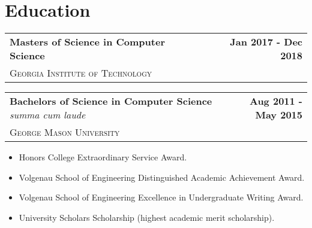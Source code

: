 \documentclass[letterpaper]{article}
\newenvironment{details}
{\begin{itemize}}
{\end{itemize}}
\begin{document}
  \setcounter{secnumdepth}{0}

  \section{Education}

  \noindent
  \begin{tabularx}{\textwidth}{@{}X r@{}}
    \textbf{Masters of Science in Computer Science} & \textbf{Jan 2017 - Dec 2018} \\
    \textsc{Georgia Institute of Technology} &
  \end{tabularx}

  \hfill\newline

  \noindent
  \begin{tabularx}{\textwidth}{@{}X r@{}}
    \textbf{Bachelors of Science in Computer Science} \emph{summa cum laude} & \textbf{Aug 2011 - May 2015} \\
    \textsc{George Mason University} &
  \end{tabularx}

  \begin{details}
  \item Honors College Extraordinary Service Award.
  \item Volgenau School of Engineering Distinguished Academic Achievement Award.
  \item Volgenau School of Engineering Excellence in Undergraduate Writing Award.
  \item University Scholars Scholarship (highest academic merit scholarship).
  \end{details}
\end{document}
